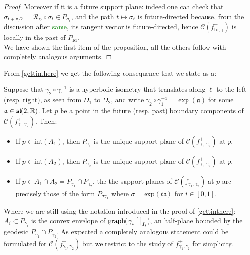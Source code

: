 \begin{proof}
    Moreover if it is a future support plane: indeed one can check that $\sigma_{t+\pi/2}=\mathcal{R}_{z_0}\circ\sigma_t\in P_{\sigma_t}$, and the path $t\mapsto\sigma_t$ is future-directed because, from the discussion after \textcolor{green}{same}, its tangent vector is future-directed, hence $\mathcal{C}(f_{\text{Id},\gamma}^+)$ is locally in the past of $P_{\text{Id}}$. \\
    We have shown the first item of the proposition, all the others follow with completely analogous arguments.
\end{proof}



From \ref{gettinthere} we get the following consequence that we state as a:

\begin{corollary}
    Suppose that $\gamma_2\circ\gamma_1^{-1}$ is a hyperbolic isometry that translates along $\ell$ to the left (resp. right), as seen from $D_1$ to $D_2$, and write $\gamma_2\circ\gamma_1^{-1}=\exp(\mathfrak{a})$ for some $\mathfrak{a}\in\mathfrak{sl}(2,\mathbb{R})$. Let $p$ be a point in the future (resp. past) boundary components of $\mathcal{C}(f_{\gamma_1,\gamma_2}^{+}).$ Then:
    \begin{itemize}
        \item If $p\in\text{int}(A_1)$, then $P_{\gamma_1}$ is the unique support plane of $\mathcal{C}(f_{\gamma_1,\gamma_2}^{+})$ at $p$. 
        \item If $p\in\text{int}(A_2)$, then $P_{\gamma_2}$ is the unique support plane of $\mathcal{C}(f_{\gamma_1,\gamma_2}^{+})$ at $p$. 
        \item If $p\in A_1\cap A_2= P_{\gamma_1}\cap P_{\gamma_2}$, the the support planes of $\mathcal{C}(f_{\gamma_1,\gamma_2}^{+})$ at $p$ are precisely those of the form $P_{\sigma\gamma_1}$ where $\sigma=\text{exp}(t\mathfrak{a})$ for $t\in [0,1].$  
    \end{itemize}

    
\end{corollary}

Where we are still using the notation introduced in the proof of \ref{gettinthere}: $A_i\subset P_{\gamma_i}$ is the convex envelope of $\text{graph}(\left.\gamma_i^{-1}\right|_{I_i}$), an half-plane bounded by the geodesic $P_{\gamma_1}\cap P_{\gamma_2}.$ As expected a completely analogous statement could be formulated for $\mathcal{C}(f_{\gamma_1,\gamma_2}^{-})$ but we restrict to the study of $f_{\gamma_1,\gamma_2}^{+}$ for simplicity. 

